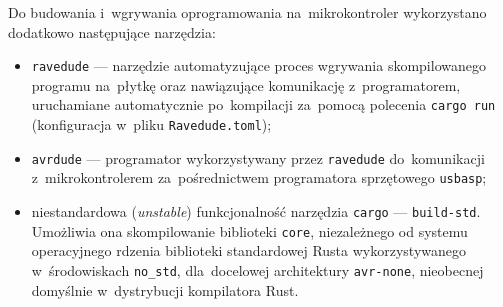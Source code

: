 Do budowania i~wgrywania oprogramowania na~mikrokontroler wykorzystano
dodatkowo następujące narzędzia:

\begin{itemize}
    \item \texttt{ravedude} --- narzędzie automatyzujące proces wgrywania
    skompilowanego programu na~płytkę oraz nawiązujące komunikację
    z~programatorem, uruchamiane automatycznie po~kompilacji za~pomocą
    polecenia \texttt{cargo~run} (konfiguracja w~pliku \texttt{Ravedude.toml});

    \item \texttt{avrdude} --- programator wykorzystywany przez
    \texttt{ravedude} do~komunikacji z~mikrokontrolerem za~pośrednictwem
    programatora sprzętowego \texttt{usbasp};

    \item niestandardowa (\textit{unstable}) funkcjonalność narzędzia
    \texttt{cargo} --- \texttt{build-std}. Umożliwia ona skompilowanie
    biblioteki \texttt{core}, niezależnego od systemu operacyjnego rdzenia
    biblioteki standardowej Rusta wykorzystywanego w~środowiskach
    \texttt{no\_std}, dla~docelowej architektury \texttt{avr-none},
    nieobecnej domyślnie w~dystrybucji kompilatora Rust.
\end{itemize}










